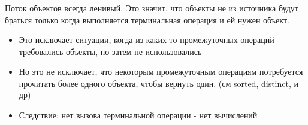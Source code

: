 \begin{frame}[noframenumbering]
\frametitle{\insertsection} 
\framesubtitle{\insertsubsection}
Поток объектов всегда ленивый. Это значит, что объекты не из источника будут браться только когда выполняется терминальная операция и ей нужен объект.
\begin{itemize}
	\item Это исключает ситуации, когда из каких-то промежуточных операций требовались объекты, но затем не использовались
	\item Но это не исключает, что некоторым промежуточным операциям потребуется прочитать более одного объекта, чтобы вернуть один. (см sorted, distinct, и др)
	\item Следствие: нет вызова терминальной операции - нет вычислений
\end{itemize}

\end{frame}